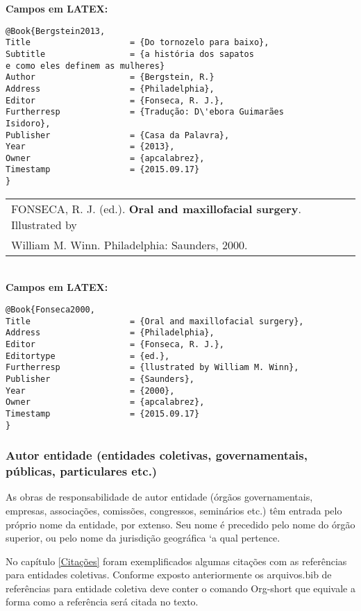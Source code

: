 \textbf{Campos em LATEX:}

\begin{verbatim}
@Book{Bergstein2013,
Title                    = {Do tornozelo para baixo},
Subtitle                 = {a história dos sapatos 
e como eles definem as mulheres}
Author                   = {Bergstein, R.}
Address                  = {Philadelphia},
Editor                   = {Fonseca, R. J.},
Furtherresp              = {Tradução: D\'ebora Guimarães
Isidoro},
Publisher                = {Casa da Palavra},
Year                     = {2013},
Owner                    = {apcalabrez},
Timestamp                = {2015.09.17}
}
\end{verbatim}

\begin{tabular}{|l|c|} \hline
	FONSECA, R. J. (ed.). \textbf{Oral and maxillofacial surgery}. Illustrated by\\
	William M. Winn. Philadelphia: Saunders, 2000. \\\hline
\end{tabular}\\

\textbf{Campos em LATEX:}

\begin{verbatim}
@Book{Fonseca2000,
Title                    = {Oral and maxillofacial surgery},
Address                  = {Philadelphia},
Editor                   = {Fonseca, R. J.},
Editortype               = {ed.},
Furtherresp              = {llustrated by William M. Winn},
Publisher                = {Saunders},
Year                     = {2000},
Owner                    = {apcalabrez},
Timestamp                = {2015.09.17}
}
\end{verbatim}


\subsubsection{Autor entidade (entidades coletivas, governamentais, públicas, particulares etc.)} 

As obras de responsabilidade de autor entidade (órgãos governamentais, empresas, associações, comissões, congressos, semin\'arios etc.) t\^em entrada pelo próprio nome da entidade, por extenso. Seu nome \'e precedido pelo nome do órgão superior, ou pelo nome da jurisdição geogr\'afica `a qual pertence. 

No capítulo \ref{Citações} foram exemplificados algumas citações com  as refer\^encias para entidades coletivas. Conforme exposto anteriormente os arquivos.bib de refer\^encias para entidade coletiva deve conter o comando Org-short que equivale a forma como a refer\^encia ser\'a citada no texto. \\


